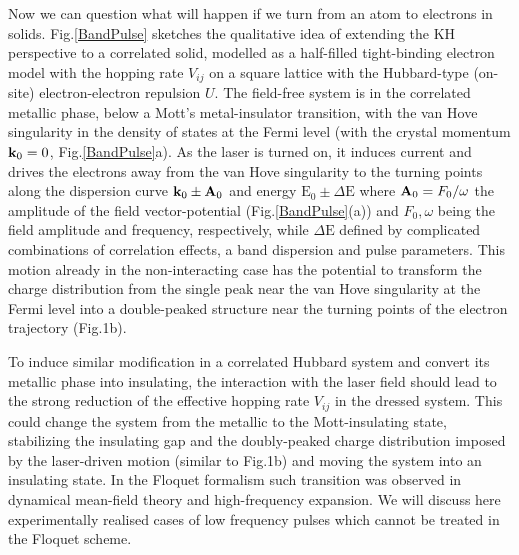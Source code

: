 \documentclass[prb,aps,twocolumn,showpacs,amsmath,amssymb]{revtex4}%
\begin{document}
Now we can question what will happen if we turn from an atom to electrons in solids. Fig.\ref{BandPulse} sketches the qualitative idea of extending the KH
perspective to a correlated solid, modelled as a
half-filled tight-binding electron model with the 
hopping rate $V_{ij}$ on a square lattice with the Hubbard-type (on-site) electron-electron repulsion $U$.
The field-free 
system is in the correlated metallic phase\cite{DMFT}, below a Mott's metal-insulator transition, with the van Hove singularity 
in the density of states at the Fermi level (with the crystal momentum 
${\bf k}_0=0$, Fig.\ref{BandPulse}a).
As the laser is turned on, it induces current and drives the 
electrons away from the van Hove singularity to the turning
points along the dispersion curve ${\bf k}_{0} \pm {\bf A}_0$ and energy $\text{E}_{0}\pm\Delta\text{E}$ 
where
${\bf A}_0=F_0/\omega$ the amplitude of the field vector-potential
(Fig.\ref{BandPulse}(a)) and $F_0, \omega$ being the field amplitude and
frequency, respectively, while $\Delta\text{E}$ defined by complicated combinations of correlation effects, a band dispersion and pulse parameters.
This motion already in the non-interacting case has the potential to 
transform the charge distribution from the 
single peak near the van Hove
singularity at the Fermi level into a double-peaked structure 
near the turning points of the electron 
trajectory (Fig.1b). 

To induce similar modification in a 
correlated Hubbard system and  convert its metallic
phase into insulating, the interaction with the laser field 
should lead to the strong reduction of the 
effective hopping rate $V_{ij}$ in the dressed system.
This could change the system from the metallic to
the Mott-insulating state, stabilizing 
the insulating gap and the doubly-peaked charge distribution 
imposed by the laser-driven motion (similar to Fig.1b) and moving the 
system into an insulating state. In the Floquet formalism such transition was observed in dynamical mean-field theory and high-frequency expansion\cite{Mikami_2016,Mikami_2019}. We will discuss here experimentally realised cases of low frequency pulses which cannot be treated in the Floquet scheme.    
\end{document}
